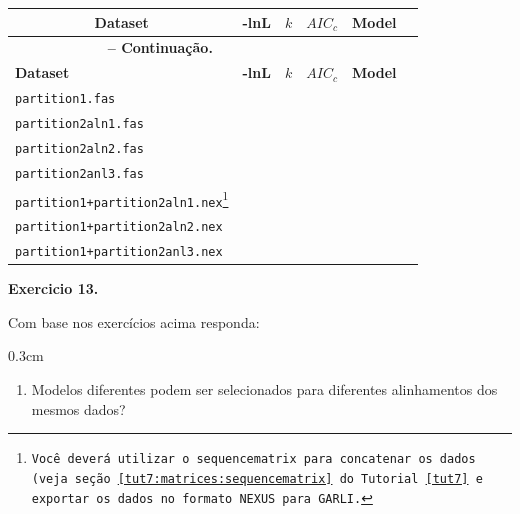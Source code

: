 \begin{refsection}
\begin{center}
\begin{longtable}{|l|>{\centering}m{2cm}|c|>{\centering}m{2cm}|>{\centering}m{2cm} |@{}m{0pt}@{}}
\hline\hline  \multicolumn{1}{|c|}{\textbf{Dataset}} & \textbf{-lnL}  & \textbf{$k$} & \textbf{$AIC_{c}$} & \textbf{Model} &\\
\endfirsthead

\multicolumn{3}{c}{{\bfseries \tablename\ \thetable{} -- Continuação.}}\\
\hline\hline \textbf{Dataset} & \textbf{-lnL}  & \textbf{$k$} & \textbf{$AIC_{c}$} & \textbf{Model} &\\
\endhead
\hline \hline
\endlastfoot
\hline\hline \texttt{partition1.fas} &  & & & &\\
\hline \texttt{partition2aln1.fas} &  & & & &\\
\hline \texttt{partition2aln2.fas} &  & & & &\\
\hline \texttt{partition2anl3.fas} &  & & & &\\
\hline \texttt{partition1+partition2aln1.nex\footnote{ Você deverá utilizar o \texttt{sequencematrix} para concatenar os dados (veja seção \ref{tut7:matrices:sequencematrix} do Tutorial \ref{tut7} e exportar os dados no formato \texttt{NEXUS} para \texttt{GARLI}.}} &  & & & &\\
\hline \texttt{partition1+partition2aln2.nex} &  & & & &\\
\hline \texttt{partition1+partition2anl3.nex} &  & & & &\\
\end{longtable}
\end{center}


\begin{blackBlock}{\textbf{Exercicio 13.}}\label{tut12:ex:13.7}

Com base nos exercícios acima responda:

\end{blackBlock}


\begin {myindentpar}{0.3cm}
\begin{enumerate}[\itshape i.]
	\item{Modelos diferentes podem ser selecionados para diferentes alinhamentos dos mesmos dados?}


\end{enumerate}
\end{myindentpar}
\end{refsection}
